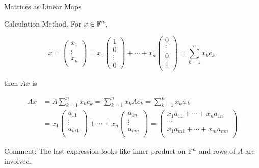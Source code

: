 \documentclass[hyperref={pdfpagelabels=true}]{beamer}
\newcommand{\<}{\langle}
\renewcommand{\>}{\rangle}
\begin{document}
\begin{frame}{Matrices as Linear Maps}
    \begin{block}{Calculation Method.}
    For $x \in \mathbb{F}^{n}$,
    \begin{spacing}{0.5}
    \[x = 
    \begin{pmatrix}
        x_{1}\\
        \vdots\\
        x_{n}\\
    \end{pmatrix}
    = 
    x_{1}
    \begin{pmatrix}
        1\\
        0\\
        \vdots\\
        0
    \end{pmatrix}
    +\cdots+
    x_{n}
    \begin{pmatrix}
        0\\
        \vdots\\
        0\\
        1\\
    \end{pmatrix}
    = \sum_{k = 1}^{n}x_{k}e_{k}.
    \]
    \end{spacing}
    then $Ax$ is 
    \begin{spacing}{0.5}
    \[
        \begin{aligned}
            Ax &= A\sum_{k = 1}^{n}x_{k}e_{k}
     = \sum_{k = 1}^{n}x_{k}Ae_{k}
     = \sum_{k = 1}^{n}x_{k}a_{\cdot k}\\
     &=
     x_{1}
     \begin{pmatrix}
        a_{11}\\
        \vdots\\
        a_{m1}\\
     \end{pmatrix}
     +\cdots+
     x_{n}
     \begin{pmatrix}
        a_{1n}\\
        \vdots\\
        a_{mn}\\
     \end{pmatrix}
     =
     \begin{pmatrix}
        x_{1}a_{11}+\cdots+x_{n}a_{1n}\\
        \cdots\\
        x_{1}a_{m1}+\cdots+x_{m}a_{mn}\\
     \end{pmatrix}
    \end{aligned}
    \]
    \end{spacing}
    \end{block}
    \begin{block}{Comment:}
        The last expression looks like inner product on $\mathbb{F}^{n}$ and rows of $A$ are involved.
    \end{block}
\end{frame}
\end{document}
